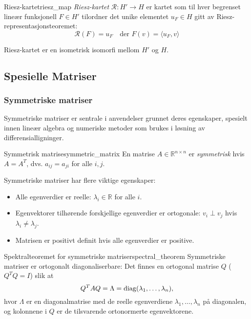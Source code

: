 \begin{definition}{Riesz-kartet}{riesz_map}
	\emph{Riesz-kartet} $\mathcal{R} : H' \to H$ er kartet som til hver begrenset lineær funksjonell $F \in H'$ tilordner det unike elementet $u_F \in H$ gitt av Riesz-representasjonsteoremet:
	\begin{equation}
		\mathcal{R}(F) = u_F \quad \text{der } F(v) = \langle u_F, v \rangle
	\end{equation}

	Riesz-kartet er en isometrisk isomorfi mellom $H'$ og $H$.
\end{definition}

\subsection{Spesielle Matriser}
\subsubsection{Symmetriske matriser}
Symmetriske matriser er sentrale i anvendelser grunnet deres egenskaper, spesielt innen lineær algebra og numeriske metoder som brukes i løsning av differensialligninger.

\begin{definition}{Symmetrisk matrise}{symmetric_matrix}
	En matrise $A \in \mathbb{R}^{n \times n}$ er \emph{symmetrisk} hvis $A = A^T$, dvs. $a_{ij} = a_{ji}$ for alle $i,j$.
\end{definition}

Symmetriske matriser har flere viktige egenskaper:
\begin{itemize}
	\item Alle egenverdier er reelle: $\lambda_i \in \mathbb{R}$ for alle $i$.
	\item Egenvektorer tilhørende forskjellige egenverdier er ortogonale: $v_i \perp v_j$ hvis $\lambda_i \neq \lambda_j$.
	\item Matrisen er positivt definit hvis alle egenverdier er positive.
\end{itemize}

\begin{theorem}{Spektralteoremet for symmetriske matriser}{spectral_theorem}
	Symmetriske matriser er ortogonalt diagonaliserbare: Det finnes en ortogonal matrise $Q$ ($Q^T Q = I$) slik at
	\[
		Q^T A Q = \Lambda = \operatorname{diag}(\lambda_1, \dots, \lambda_n),
	\]
	hvor $\Lambda$ er en diagonalmatrise med de reelle egenverdiene $\lambda_1, \dots, \lambda_n$ på diagonalen, og kolonnene i $Q$ er de tilsvarende ortonormerte egenvektorene.
\end{theorem}

